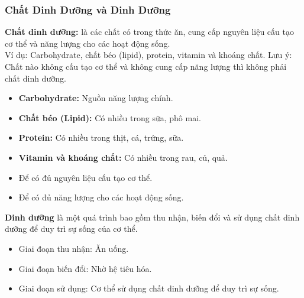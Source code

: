 \documentclass[Main.tex]{subfiles}
\begin{document}
\subsubsection{Chất Dinh Dưỡng và Dinh Dưỡng}
		\begin{ghinho}
			\textbf{Chất dinh dưỡng:} là các chất có trong thức ăn, cung cấp nguyên liệu cấu tạo cơ thể và năng lượng cho các hoạt động sống.\\
			Ví dụ: Carbohydrate, chất béo (lipid), protein, vitamin và khoáng chất.
			Lưu ý: Chất nào không cấu tạo cơ thể và không cung cấp năng lượng thì không phải chất dinh dưỡng.
		\end{ghinho}
    \begin{itemize}
        \item \textbf{Carbohydrate:} Nguồn năng lượng chính.
        \item \textbf{Chất béo (Lipid):} Có nhiều trong sữa, phô mai.
        \item \textbf{Protein:} Có nhiều trong thịt, cá, trứng, sữa.
        \item \textbf{Vitamin và khoáng chất:} Có nhiều trong rau, củ, quả.
    \end{itemize}
    \begin{itemize}
        \item Để có đủ nguyên liệu cấu tạo cơ thể.
        \item Để có đủ năng lượng cho các hoạt động sống.
    \end{itemize}
    \begin{tomtat}
    	\textbf{Dinh dưỡng} là một quá trình bao gồm thu nhận, biến đổi và sử dụng chất dinh dưỡng để duy trì sự sống của cơ thể.
        \begin{itemize}
            \item Giai đoạn thu nhận: Ăn uống.
            \item Giai đoạn biến đổi: Nhờ hệ tiêu hóa.
            \item Giai đoạn sử dụng: Cơ thể sử dụng chất dinh dưỡng để duy trì sự sống.
        \end{itemize}
    \end{tomtat}
\end{document}
